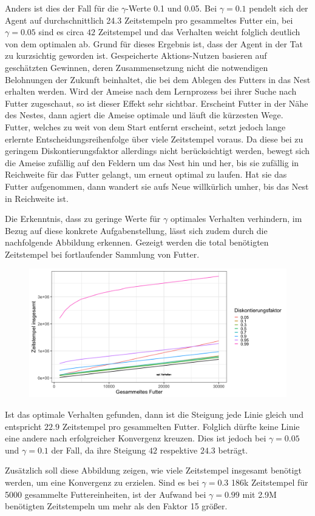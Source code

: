 \par 
Anders ist dies der Fall für die $\gamma$-Werte 0.1 und 0.05. Bei $\gamma = 0.1$ pendelt sich der Agent auf durchschnittlich 24.3 Zeitstempeln pro gesammeltes Futter ein, bei $\gamma = 0.05$ sind es circa $42$ Zeitstempel und das Verhalten weicht folglich deutlich von dem optimalen ab. Grund für dieses Ergebnis ist, dass der Agent in der Tat zu \glqq kurzsichtig\grqq{} geworden ist. Gespeicherte Aktions-Nutzen basieren auf geschätzten Gewinnen, deren Zusammensetzung nicht die notwendigen Belohnungen der Zukunft beinhaltet, die bei dem Ablegen des Futters in das Nest erhalten werden. Wird der Ameise nach dem Lernprozess bei ihrer Suche nach Futter zugeschaut, so ist dieser Effekt sehr sichtbar. Erscheint Futter in der Nähe des Nestes, dann agiert die Ameise optimale und läuft die kürzesten Wege. Futter, welches zu weit von dem Start entfernt erscheint, setzt jedoch lange erlernte Entscheidungsreihenfolge über viele Zeitstempel voraus. Da diese bei zu geringem Diskontierungsfaktor allerdings nicht berücksichtigt werden, bewegt sich die Ameise zufällig auf den Feldern um das Nest hin und her, bis sie zufällig in Reichweite für das Futter gelangt, um erneut optimal zu laufen. Hat sie das Futter aufgenommen, dann wandert sie aufs Neue willkürlich umher, bis das Nest in Reichweite ist.
\par 
Die Erkenntnis, dass zu geringe Werte für $\gamma$ optimales Verhalten verhindern, im Bezug auf diese konkrete Aufgabenstellung, lässt sich zudem durch die nachfolgende Abbildung erkennen. Gezeigt werden die total benötigten Zeitstempel bei fortlaufender Sammlung von Futter.
\begin{figure}[H]
    \centering
    \includegraphics[width=\textwidth]{images/optDiscTotalTS}
    \label{fig:test1}
\end{figure}
Ist das optimale Verhalten gefunden, dann ist die Steigung jede Linie gleich und entspricht $22.9$ Zeitstempel pro gesammelten Futter. Folglich dürfte keine Linie eine andere nach erfolgreicher Konvergenz kreuzen. Dies ist jedoch bei $\gamma = 0.05$ und $\gamma = 0.1$ der Fall, da ihre Steigung $42$ respektive $24.3$ beträgt.
\par 
Zusätzlich soll diese Abbildung zeigen, wie viele Zeitstempel insgesamt benötigt werden, um eine Konvergenz zu erzielen. Sind es bei $\gamma = 0.3$ 186k Zeitstempel für 5000 gesammelte Futtereinheiten, ist der Aufwand bei $\gamma = 0.99$ mit 2.9M benötigten Zeitstempeln um mehr als den Faktor 15 größer.


